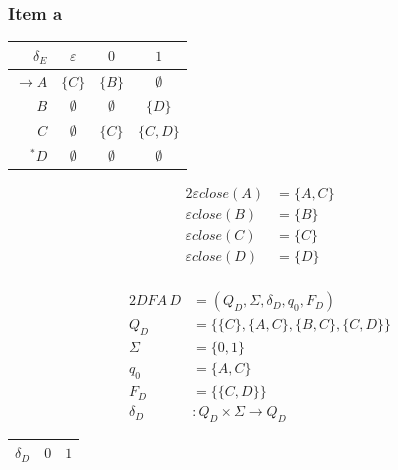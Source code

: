 {\subsubsection{Item a}
\begin{center}
\begin{minipage}{0.35\textwidth}
\begin{center} \begin{tabular}{r | c c c}
	$\delta_E     $ & $\varepsilon$ & $0        $ & $1        $ \\ \hline
	$\rightarrow A$ & $\{C      \}$ & $\{B    \}$ & $\emptyset$ \\
	$            B$ & $\emptyset  $ & $\emptyset$ & $\{D    \}$ \\
	$            C$ & $\emptyset  $ & $\{C    \}$ & $\{C,D  \}$\\
	$      ^* D$ & $\emptyset  $ & $\emptyset$ & $\emptyset$
\end{tabular} \end{center}
\end{minipage}%
\begin{minipage}{0.25\textwidth}
	\begin{alignat*}{2}
		\varepsilon close(A)&=\{A,C\}\\
		\varepsilon close(B)&=\{B\}\\
		\varepsilon close(C)&=\{C\}\\
		\varepsilon close(D)&=\{D\}\\
	\end{alignat*}
\end{minipage}
\end{center}
\begin{center}
\begin{minipage}[c]{0.44\textwidth}
	\begin{alignat*}{2}
		DFA\,D    &= (Q_D, \Sigma, \delta_D, q_0, F_D)\\
		Q_D      &= \{\{C\},\{A,C\},\{B,C\},\{C,D\}\}\\
		\Sigma   &= \{0,1\}\\
		q_0      &= \{A,C\}\\
		F_D      &= \{\{C,D\}\}\\
		\delta_D &\colon Q_D \times \Sigma \rightarrow Q_D
	\end{alignat*}
\end{minipage}%
\begin{minipage}[c]{0.32\textwidth}
\begin{center} \begin{tabular}{r | c c}
	$\delta_D           $ & $0      $ & $1      $ \\ \hline

\end{tabular}
\end{center}
\end{minipage}
\end{center}}
